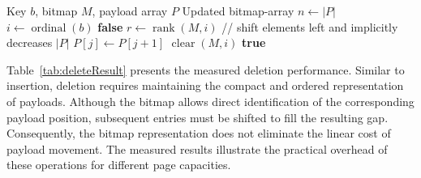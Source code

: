 \documentclass[11pt,twoside]{article}
\begin{document}
    \begin{algorithm}
        \caption{Delete from bitmap-array}
        \label{alg:bitmap-delete}
        \begin{algorithmic}[1]
\Require Key $b$, bitmap $M$, payload array $P$
\Ensure Updated bitmap-array
\State $n \gets |P|$
\State $i \gets \operatorname{ordinal}(b)$
    \State \Return \textbf{false}
\EndIf
\State $r \gets \operatorname{rank}(M,i)$
\State // shift elements left and implicitly decreases $|P|$
    \State $P[j] \gets P[j+1]$
\EndFor
\State $\operatorname{clear}(M,i)$
\State \Return \textbf{true}
        \end{algorithmic}
    \end{algorithm}


    Table~\ref{tab:deleteResult} presents the measured deletion performance. Similar to insertion,
    deletion requires maintaining the compact and ordered representation of payloads. Although the
    bitmap allows direct identification of the corresponding payload position, subsequent
    entries must be shifted to fill the resulting gap. Consequently, the bitmap representation
    does not eliminate the linear cost of payload movement. The measured results
    illustrate the practical overhead of these operations for different page capacities.

    \begin{table}[ht]
        \caption{Benchmarking delete operation.}
        \label{tab:deleteResult}
    \end{table}
\end{document}
